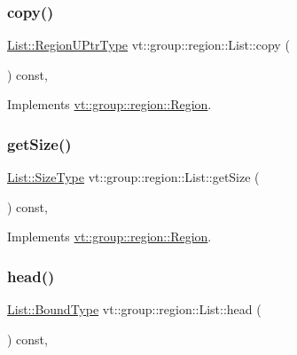 \subsubsection{\texorpdfstring{copy()}{copy()}}
{\footnotesize\ttfamily \hyperlink{structvt_1_1group_1_1region_1_1_region_ae5f42cf159116a3cf8bd65423eb01037}{List\+::\+Region\+U\+Ptr\+Type} vt\+::group\+::region\+::\+List\+::copy (\begin{DoxyParamCaption}{ }\end{DoxyParamCaption}) const\hspace{0.3cm}{\ttfamily [override]}, {\ttfamily [virtual]}}



Implements \hyperlink{structvt_1_1group_1_1region_1_1_region_a040d20a4f8c6fa351d7fe1cbfcae3a03}{vt\+::group\+::region\+::\+Region}.

\mbox{\label{structvt_1_1group_1_1region_1_1_list_a9a74188a75483097c41253616527ac46}} 
\subsubsection{\texorpdfstring{get\+Size()}{getSize()}}
{\footnotesize\ttfamily \hyperlink{structvt_1_1group_1_1region_1_1_region_a9bb381adf31111aae34dbc644bad6c1f}{List\+::\+Size\+Type} vt\+::group\+::region\+::\+List\+::get\+Size (\begin{DoxyParamCaption}{ }\end{DoxyParamCaption}) const\hspace{0.3cm}{\ttfamily [override]}, {\ttfamily [virtual]}}



Implements \hyperlink{structvt_1_1group_1_1region_1_1_region_ab0db5f78c57943b4b9973ba2c7c619f7}{vt\+::group\+::region\+::\+Region}.

\mbox{\label{structvt_1_1group_1_1region_1_1_list_a99c726e227dbac4f8efaa45a37033238}} 
\subsubsection{\texorpdfstring{head()}{head()}}
{\footnotesize\ttfamily \hyperlink{structvt_1_1group_1_1region_1_1_region_abf426ff85bed72c1c6524fad6a9f1751}{List\+::\+Bound\+Type} vt\+::group\+::region\+::\+List\+::head (\begin{DoxyParamCaption}{ }\end{DoxyParamCaption}) const\hspace{0.3cm}{\ttfamily [override]}, {\ttfamily [virtual]}}



